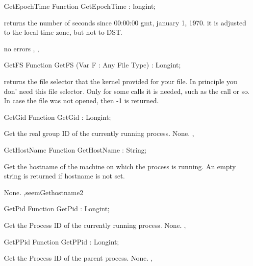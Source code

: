 \begin{function}{GetEpochTime}
\Declaration
Function GetEpochTime  : longint;

\Description

returns the number of seconds since 00:00:00 gmt, january 1, 1970.
it is adjusted to the local time zone, but not to DST.

\Errors
no errors
\SeeAlso
{}, , 
\end{function}
\html{}
\begin{function}{GetFS}
\Declaration
Function GetFS (Var F : Any File Type) : Longint;

\Description
{} returns the file selector that the kernel provided for your
file. In principle you don' need this file selector. Only for some calls
it is needed, such as the  call or so.
\Errors
In case the file was not opened, then -1 is returned.
\SeeAlso
{}
\end{function}
\html{}
\begin{function}{GetGid}
\Declaration
Function GetGid  : Longint;

\Description
 Get the real group ID of the currently running process.
\Errors
None.
\SeeAlso
{},  
\end{function}
\html{}
\begin{function}{GetHostName}
\Declaration
Function GetHostName  : String;

\Description

Get the hostname of the machine on which the process is running.
An empty string is returned if hostname is not set.

\Errors
None.
\SeeAlso
 ,seem{Gethostname}{2} 
\end{function}
\html{}
\begin{function}{GetPid}
\Declaration
Function GetPid  : Longint;

\Description
 Get the Process ID of the currently running process.
\Errors
None.
\SeeAlso
{}, 
\end{function}
\html{}
\begin{function}{GetPPid}
\Declaration
Function GetPPid  : Longint;

\Description
 Get the Process ID of the parent process.
\Errors
None.
\SeeAlso
{}, 
\end{function}
